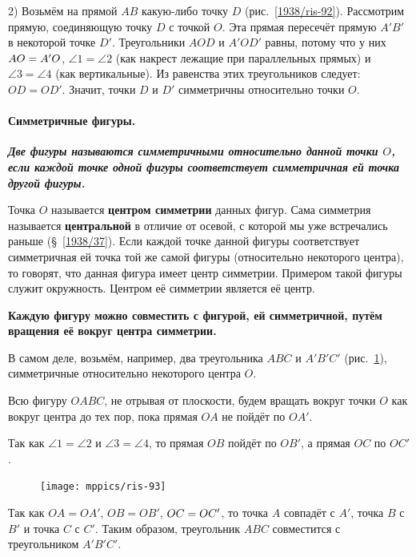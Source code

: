 2) Возьмём на прямой $AB$ какую-либо точку $D$ (рис.~\ref{1938/ris-92}).
Рассмотрим прямую, соединяющую точку $D$ с точкой $O$.
Эта прямая пересечёт прямую $A'B'$ в некоторой точке $D'$.
Треугольники $AOD$ и $A'OD'$ равны, потому что у них $AO\z=A'O$, $\angle 1 = \angle 2$ (как накрест лежащие при параллельных прямых) и $\angle 3 = \angle 4$ (как вертикальные).
Из равенства этих треугольников следует:
$OD = OD'$.
Значит, точки $D$ и $D'$ симметричны относительно точки $O$.


\paragraph{Симметричные фигуры.}\label{1938/86}
\textbf{\emph{Две фигуры называются симметричными относительно данной точки $O$, если каждой точке одной фигуры соответствует симметричная ей точка другой фигуры.}} 

Точка $O$ называется \textbf{центром симметрии} данных фигур.
Сама симметрия называется \textbf{центральной} в отличие от осевой, с которой мы уже встречались раньше (§~\ref{1938/37}).
Если каждой точке данной фигуры соответствует симметричная ей точка той же самой фигуры (относительно некоторого центра), то говорят, что данная фигура имеет центр симметрии.
Примером такой фигуры служит окружность.
Центром её симметрии является её центр.

\textbf{Каждую фигуру можно совместить с фигурой, ей симметричной, путём вращения её вокруг центра симметрии.}

В самом деле, возьмём, например, два треугольника $ABC$ и $A'B'C'$ (рис.~\ref{1938/ris-93}), симметричные относительно некоторого центра $O$.

Всю фигуру $OABC$, не отрывая от плоскости, будем вращать вокруг точки $O$ как вокруг центра до тех пор, пока прямая $OA$ не пойдёт по $OA'$.

Так как $\angle 1 = \angle 2$ и $\angle 3 = \angle 4$, то прямая $OB$ пойдёт по $OB'$, а прямая $OC$ по $OC'$.

\begin{figure}
\centering
\texttt{[image: mppics/ris-93]}
\caption{}\label{1938/ris-93}
\end{figure}

Так как $OA = OA'$, $OB=OB'$, $OC\z=OC'$, то точка $A$ совпадёт с $A'$, точка $B$ с $B'$ и точка $C$ с $C'$.
Таким образом, треугольник $ABC$ совместится с треугольником $A'B'C'$.


